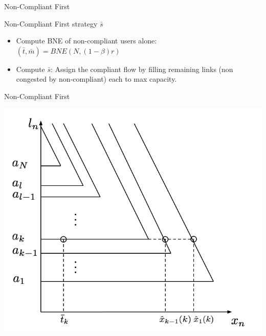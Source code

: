 \documentclass[english, smaller]{beamer}
\theoremstyle{plain}
\theoremstyle{definition}
\theoremstyle{plain}
\theoremstyle{plain}
\begin{document}
\begin{frame}{Non-Compliant First}

\begin{block}{Non-Compliant First strategy $\bar{s}$}
\begin{itemize}
\item Compute BNE of non-compliant users alone: $(\bar{t}, \bar{m}) = BNE(N, (1-\beta)r)$
\item \alert{Compute $\bar{s}$: Assign the compliant flow by filling remaining links (non congested by non-compliant) each to max capacity.}
\end{itemize}
\end{block}

\end{frame}

\begin{frame}{Non-Compliant First}

\begin{center}
\includegraphics[scale=0.25]{../../figures/presentation/optimal_stackelberg2.png}
\end{center}

\end{frame}
\end{document}

